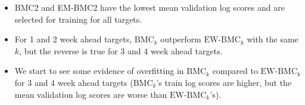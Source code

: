 \documentclass[
]{article}
\begin{document}
\begin{itemize}
\item BMC2 and EM-BMC2 have the lowest mean validation log scores and are selected for training for all targets. 
\item For 1 and 2 week ahead targets, $\text{BMC}_k$ outperform $\text{EW-BMC}_k$ with the same $k$, but the reverse is true for 3 and 4 week ahead targets.
\item We start to see some evidence of overfitting in $\text{BMC}_k$ compared to $\text{EW-BMC}_k$ for 3 and 4 week ahead targets ($\text{BMC}_k$'s train log scores are higher, but the mean validation log scores are worse than $\text{EW-BMC}_k$'s).
\end{itemize}

\newpage

\begin{table}[H]


\end{table}
\end{document}

